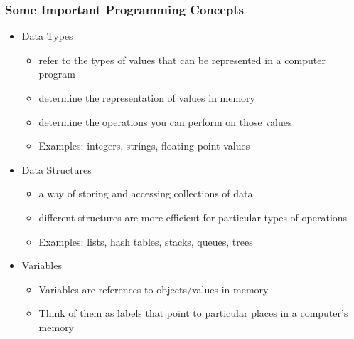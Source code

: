 \documentclass{beamer}
\begin{document}
\begin{frame}
  \frametitle{Some Important Programming Concepts}
\begin{itemize}

\item Data Types
\begin{itemize}
	\item refer to the types of values that can be represented in a computer program
	\item determine the representation of values in memory
	\item determine the operations you can perform on those values
	\item Examples: integers, strings, floating point values
\end{itemize}

\item Data Structures
\begin{itemize}
	\item a way of storing and accessing collections of data
	\item different structures are more efficient for particular types of operations
	\item Examples: lists, hash tables, stacks, queues, trees
\end{itemize}

\item Variables
\begin{itemize}
	\item Variables are references to objects/values in memory
	\item Think of them as labels that point to particular places in a computer's memory
\end{itemize}


\end{itemize}

\end{frame}
\end{document}
